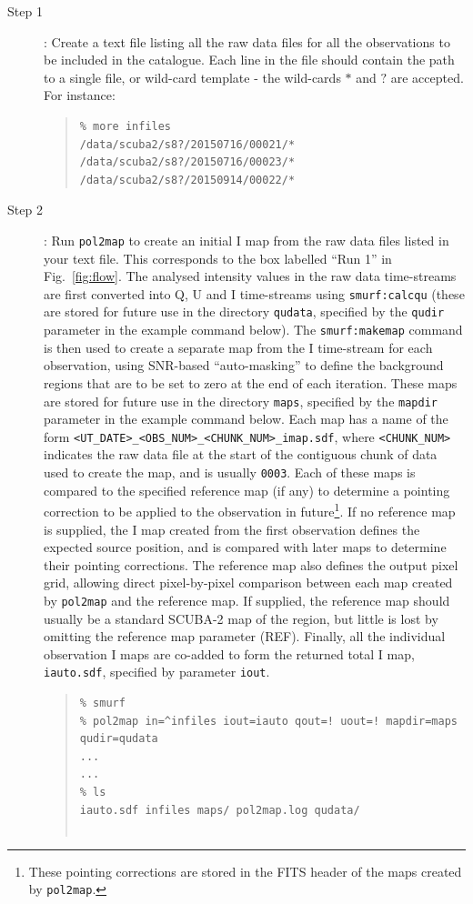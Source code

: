 \documentclass[twoside,11pt]{starlink}
\begin{document}
\begin{description}
\item[Step 1]:  Create a text file listing all the raw data files for all
the observations to be included in the catalogue. Each line in the file
should contain the path to a single file, or wild-card template - the
wild-cards $*$ and $?$ are accepted. For instance:
\begin{quote}
\begin{verbatim}
% more infiles
/data/scuba2/s8?/20150716/00021/*
/data/scuba2/s8?/20150716/00023/*
/data/scuba2/s8?/20150914/00022/*
\end{verbatim}
\end{quote}

\item[Step 2]:  Run \texttt{pol2map} to create an initial I map from
the raw data files listed in your text file. This corresponds to the box
labelled ``Run 1'' in Fig.~\ref{fig:flow}. The analysed intensity
values in the raw data time-streams are first converted into Q, U and I
time-streams using \texttt{smurf:calcqu} (these are stored for future use
in the directory \texttt{qudata}, specified by the \texttt{qudir}
parameter in the example command below). The \texttt{smurf:makemap} command is then used to create a
separate map from the I time-stream for each observation, using SNR-based
``auto-masking'' to define the background regions that are to be set to
zero at the end of each iteration. These maps are stored for future use
in the directory \texttt{maps}, specified by the
\texttt{mapdir} parameter in the example command below. Each map has a name of the form
\texttt{<UT\_DATE>\_<OBS\_NUM>\_<CHUNK\_NUM>\_imap.sdf}, where
\texttt{<CHUNK\_NUM>} indicates the raw data file at the start of the
contiguous chunk of data used to create the map, and is usually \texttt{0003}.
Each of these maps is compared to the specified reference map (if any)
to determine a pointing correction to be applied to the observation in
future\footnote{These pointing corrections are stored in the FITS header of
the maps created by \texttt{pol2map}.}. If no reference map is supplied, the I map created from the
first observation defines the expected source position, and is compared
with later maps to determine their pointing corrections. The reference map also
defines the output pixel grid, allowing direct pixel-by-pixel comparison between
each map created by \texttt{pol2map} and the reference map. If supplied,
the reference map should usually be a standard SCUBA-2 map of the region,
but little is lost by omitting the reference map parameter (REF).
Finally, all the individual observation I maps are co-added to form the returned
total I map, \texttt{iauto.sdf}, specified by parameter \texttt{iout}.
\begin{quote}
\begin{verbatim}
% smurf
% pol2map in=^infiles iout=iauto qout=! uout=! mapdir=maps qudir=qudata
...
...
% ls
iauto.sdf infiles maps/ pol2map.log qudata/


\end{verbatim}
\end{quote}
\end{description}
\end{document}

